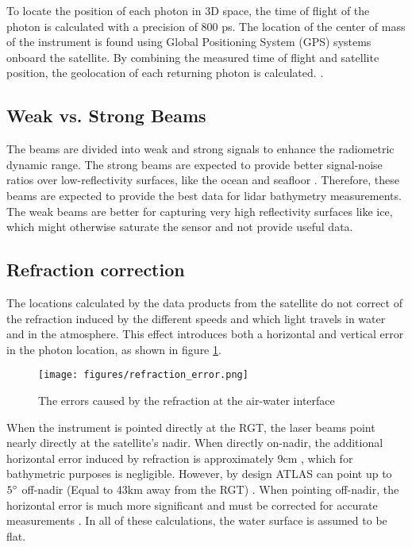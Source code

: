 To locate the position of each photon in 3D space, the time of flight of the photon is calculated with a precision of 800 ps\parencite{Neumann2019d}. The location of the center of mass of the instrument is found using Global Positioning System (GPS) systems onboard the satellite. By combining the measured time of flight and satellite position, the geolocation of each returning photon is calculated. \parencite{Neumann2019d}. 


\subsection{Weak vs. Strong Beams}

The beams are divided into weak and strong signals to enhance the radiometric dynamic range. The strong beams are expected to provide better signal-noise ratios over low-reflectivity surfaces, like the ocean and seafloor \parencite{Neumann2019d}. Therefore, these beams are expected to provide the best data for lidar bathymetry measurements. The weak beams are better for capturing very high reflectivity surfaces like ice, which might otherwise saturate the sensor and not provide useful data. 

\subsection{Refraction correction}

The locations calculated by the data products from the satellite do not correct of the refraction induced by the different speeds and which light travels in water and in the atmosphere. This effect introduces both a horizontal and vertical error in the photon location, as shown in figure \ref{refract-image}. 

\begin{figure}[ht]
      \centering
      \texttt{[image: figures/refraction\_error.png]}
      \caption{The errors caused by the refraction at the air-water interface}
      \label{refract-image}
\end{figure}

When the instrument is pointed directly at the RGT, the laser beams point nearly directly at the satellite's nadir. When directly on-nadir, the additional horizontal error induced by refraction is approximately 9cm \parencite{Parrish2019}, which for bathymetric purposes is negligible. However, by design ATLAS can point up to $5 \degree$ off-nadir (Equal to 43km away from the RGT) \parencite{Magruder2021}. When pointing off-nadir, the horizontal error is much more significant and must be corrected for accurate measurements \parencite{Parrish2019}. In all of these calculations, the water surface is assumed to be flat.


